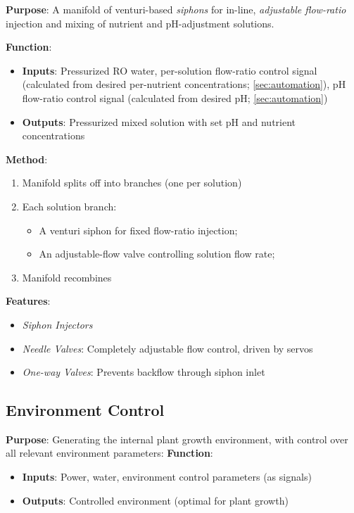 \documentclass{report}
\begin{document}
\textbf{Purpose}: A manifold of venturi-based \textit{siphons} for in-line, \textit{adjustable flow-ratio} injection and mixing of nutrient and pH-adjustment solutions.

\textbf{Function}:
\begin{itemize}
    \item \textbf{Inputs}: Pressurized RO water, per-solution flow-ratio control signal (calculated from desired per-nutrient concentrations; \ref{sec:automation}), pH flow-ratio control signal (calculated from desired pH; \ref{sec:automation})
    \item \textbf{Outputs}: Pressurized mixed solution with set pH and nutrient concentrations
\end{itemize}

\textbf{Method}:
\begin{enumerate}
    \item Manifold splits off into branches (one per solution)
    \item Each solution branch:
    \begin{itemize}
        \item A venturi siphon for fixed flow-ratio injection;
        \item An adjustable-flow valve controlling solution flow rate;
    \end{itemize}
    \item Manifold recombines
\end{enumerate}

\textbf{Features}:
\begin{itemize}
    \item \textit{Siphon Injectors}
    \item \textit{Needle Valves}: Completely adjustable flow control, driven by servos
    \item \textit{One-way Valves}: Prevents backflow through siphon inlet
\end{itemize}


\newpage

\subsection{Environment Control}
\label{sec:environment}

\textbf{Purpose}: Generating the internal plant growth environment, with control over all relevant environment parameters:
\textbf{Function}:
\begin{itemize}
    \item \textbf{Inputs}: Power, water, environment control parameters (as signals)
    \item \textbf{Outputs}: Controlled environment (optimal for plant growth)
\end{itemize}
\end{document}
